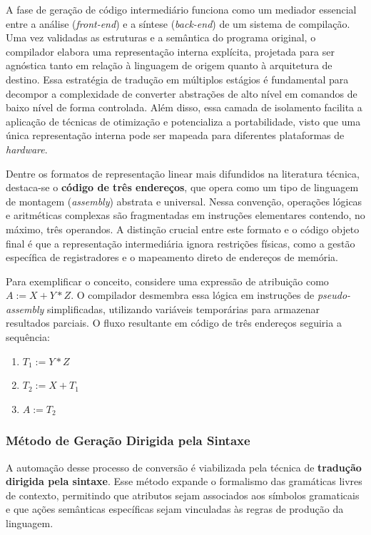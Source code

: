 A fase de geração de código intermediário funciona como um mediador essencial entre a análise (\textit{front-end}) e a síntese (\textit{back-end}) de um sistema de compilação. Uma vez validadas as estruturas e a semântica do programa original, o compilador elabora uma representação interna explícita, projetada para ser agnóstica tanto em relação à linguagem de origem quanto à arquitetura de destino. Essa estratégia de tradução em múltiplos estágios é fundamental para decompor a complexidade de converter abstrações de alto nível em comandos de baixo nível de forma controlada. Além disso, essa camada de isolamento facilita a aplicação de técnicas de otimização e potencializa a portabilidade, visto que uma única representação interna pode ser mapeada para diferentes plataformas de \textit{hardware}.



Dentre os formatos de representação linear mais difundidos na literatura técnica, destaca-se o \textbf{código de três endereços}, que opera como um tipo de linguagem de montagem (\textit{assembly}) abstrata e universal. Nessa convenção, operações lógicas e aritméticas complexas são fragmentadas em instruções elementares contendo, no máximo, três operandos. A distinção crucial entre este formato e o código objeto final é que a representação intermediária ignora restrições físicas, como a gestão específica de registradores e o mapeamento direto de endereços de memória.

Para exemplificar o conceito, considere uma expressão de atribuição como $A := X + Y * Z$. O compilador desmembra essa lógica em instruções de \textit{pseudo-assembly} simplificadas, utilizando variáveis temporárias para armazenar resultados parciais. O fluxo resultante em código de três endereços seguiria a sequência:
\begin{enumerate}
    \item $T_1 := Y * Z$
    \item $T_2 := X + T_1$
    \item $A := T_2$
\end{enumerate}

\subsubsection*{Método de Geração Dirigida pela Sintaxe}

A automação desse processo de conversão é viabilizada pela técnica de \textbf{tradução dirigida pela sintaxe}. Esse método expande o formalismo das gramáticas livres de contexto, permitindo que atributos sejam associados aos símbolos gramaticais e que ações semânticas específicas sejam vinculadas às regras de produção da linguagem.




